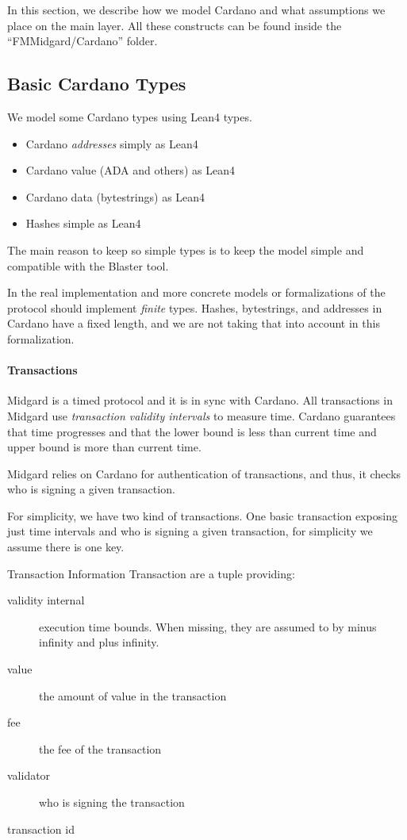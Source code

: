 In this section, we describe how we model Cardano and what assumptions we place
on the main layer.
%
All these constructs can be found inside the ``FMMidgard/Cardano'' folder.

\subsection{Basic Cardano Types}

We model some Cardano types using Lean4 types.
%
\begin{itemize}
    \item Cardano \emph{addresses} simply as Lean4 
    \item Cardano value (ADA and others) as Lean4 
    \item Cardano data (bytestrings) as Lean4 
    \item Hashes simple as Lean4 
\end{itemize}
%
The main reason to keep so simple types is to keep the model simple and
compatible with the Blaster tool.

In the real implementation and more concrete models or formalizations of the
protocol should implement \emph{finite} types.
%
Hashes, bytestrings, and addresses in Cardano have a fixed length, and we are
not taking that into account in this formalization.

\paragraph*{Transactions}

Midgard is a timed protocol and it is in sync with Cardano.
%
All transactions in Midgard use \emph{transaction validity intervals} to
measure time.
%
Cardano guarantees that time progresses and that the lower bound is less than
current time and upper bound is more than current time.

Midgard relies on Cardano for authentication of transactions, and thus, it
checks who is signing a given transaction.

For simplicity, we have two kind of transactions.
%
One basic transaction exposing just time intervals and who is signing a given
transaction, for simplicity we assume there is one key.

\begin{definition}{Transaction Information}
\label{dfn:InputInfo}
Transaction are a tuple providing:
\begin{description}
  \item[validity internal]
        execution time bounds. When missing, they are assumed to by minus
        infinity and plus infinity.
  \item[value] the amount of value in the transaction
  \item[fee] the fee of the transaction
  \item[validator] who is signing the transaction
  \item[transaction id]
  \end{description}
\end{definition}

